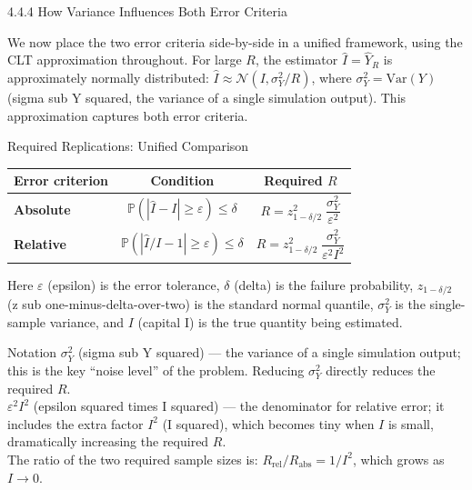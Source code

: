 \documentclass[aspectratio=169,10pt]{beamer}
\begin{document}
\begin{frame}[allowframebreaks]{4.4.4 How Variance Influences Both Error Criteria}

We now place the two error criteria side-by-side in a unified framework, using
the CLT approximation throughout.  For large $R$, the estimator $\hat{I} = \hat{Y}_R$
is approximately normally distributed: $\hat{I} \approx \mathcal{N}(I, \sigma_Y^2/R)$,
where $\sigma_Y^2 = \mathrm{Var}(Y)$ (sigma sub Y squared, the variance of a single
simulation output).  This approximation captures both error criteria.

\begin{block}{Required Replications: Unified Comparison}
  \begin{center}
    \begin{tabular}{lcc}
      \toprule
      Error criterion & Condition & Required $R$ \\[3pt]
      \midrule
      \textbf{Absolute} & $\mathbb{P}(|\hat{I} - I| \geq \varepsilon) \leq \delta$
        & $R = z_{1-\delta/2}^2\;\dfrac{\sigma_Y^2}{\varepsilon^2}$ \\[8pt]
      \textbf{Relative} & $\mathbb{P}(|\hat{I}/I - 1| \geq \varepsilon) \leq \delta$
        & $R = z_{1-\delta/2}^2\;\dfrac{\sigma_Y^2}{\varepsilon^2 I^2}$ \\
      \bottomrule
    \end{tabular}
  \end{center}
  Here $\varepsilon$ (epsilon) is the error tolerance, $\delta$ (delta) is the
  failure probability, $z_{1-\delta/2}$ (z sub one-minus-delta-over-two) is the
  standard normal quantile, $\sigma_Y^2$ is the single-sample variance, and
  $I$ (capital I) is the true quantity being estimated.
\end{block}

\begin{block}{Notation}
  $\sigma_Y^2$ (sigma sub Y squared) --- the variance of a single simulation
  output; this is the key ``noise level'' of the problem.  Reducing $\sigma_Y^2$
  directly reduces the required $R$.\\[4pt]
  $\varepsilon^2 I^2$ (epsilon squared times I squared) --- the denominator for
  relative error; it includes the extra factor $I^2$ (I squared), which becomes
  tiny when $I$ is small, dramatically increasing the required $R$.\\[4pt]
  The ratio of the two required sample sizes is:
  $R_{\mathrm{rel}} / R_{\mathrm{abs}} = 1/I^2$,
  which grows as $I \to 0$.
\end{block}


\end{frame}
\end{document}
